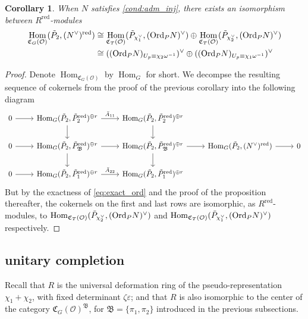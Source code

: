 \documentclass[leqno]{amsart}
\newcommand{\Ord}{\textnormal{Ord}}
\DeclareMathOperator{\red}{red}
\newcommand{\oo}{\mathcal O}
\newcommand{\1}{\mathbf{1}}
\newcommand{\fC}{\mathfrak C}
\newcommand{\B}{\mathfrak B}
\DeclareMathOperator{\Hom}{Hom}
\newtheorem{cor}[thm]{Corollary}
\theoremstyle{definition}
\theoremstyle{remark}
\begin{document}
\begin{cor}
	When $N$ satisfies \eqref{cond:adm_inj}, 
	there exists an isomorphism between $R^{\red}$-modules
    \begin{align}
	    \Hom_{\fC_{G}(\oo)}(\tilde{P}_2,(N^\vee)^{\red})
	    &\cong
	    \Hom_{\fC_{T}(\oo)}(\tilde{P}_{\chi_1^\vee}, (\Ord_PN)^\vee)\oplus
	    \Hom_{\fC_{T}(\oo)}(\tilde{P}_{\chi_2^\vee},(\Ord_PN)^\vee)\\
	    &\cong
	    ((\Ord_PN)_{U_p\equiv \chi_2\omega^{-1}})^\vee\oplus
	    ((\Ord_PN)_{U_p\equiv \chi_1\omega^{-1}})^\vee
    \end{align}
\end{cor}
\begin{proof}
	Denote $\Hom_{\fC_{G}(\oo)}$ by $\Hom_G$ for short.
	We decompse the resulting sequence of cokernels
	from the proof of the previous corollary into the following diagram
\begin{equation*}
    \begin{tikzcd}
	    0 \arrow[r]& \Hom_{G}(\tilde{P}_2, \tilde{P}_2^{\red})^{\oplus r}
	    \arrow[r,"\bar{A}_{11}"] \arrow[d]&
	    \Hom_{G}(\tilde{P}_2, \tilde{P}_2^{\red})^{\oplus r}
	    \arrow[d] &&\\
	    0\arrow[r] & \Hom_{G}(\tilde{P}_2, \tilde{P}_\B^{\red})^{\oplus r}
	    \arrow[r] 
	    \arrow[d] &
	    \Hom_{G}(\tilde{P}_2, \tilde{P}_\B^{\red})^{\oplus r}
	    \arrow[d] \arrow[r]&
	    \Hom_{G}(\tilde{P}_2, (N^\vee)^{\red})\arrow[r]&0\\
	    0\arrow[r] & \Hom_{G}(\tilde{P}_2, \tilde{P}_1^{\red})^{\oplus r}
	    \arrow[r,"\bar{A}_{22}"] &
	    \Hom_{G}(\tilde{P}_2, \tilde{P}_1^{\red})^{\oplus r}&&
    \end{tikzcd}
\end{equation*}
But by the exactness of \eqref{eq:exact_ord}
and the proof of the proposition thereafter,
the cokernels on the first and last rows
are isomorphic, as  $R^{\red}$-modules,
to $\Hom_{\fC_T(\oo)}(\tilde{P}_{\chi_2^\vee}, (\Ord_PN)^\vee)$ and
$\Hom_{\fC_T(\oo)}(\tilde{P}_{\chi_1^\vee}, (\Ord_PN)^\vee)$ respectively.
\end{proof}  

\subsection{unitary completion}

Recall that $R$ is the universal deformation ring
of the pseudo-representation
$\chi_1+\chi_2$, with fixed determinant  $\zeta\varepsilon$;
and that  $R$
is also isomorphic to the center
of the category  $\fC_G(\oo)^\B$,
for  $\B=\{\pi_1,\pi_2\}$ 
introduced in the previous subsections.
\end{document}
